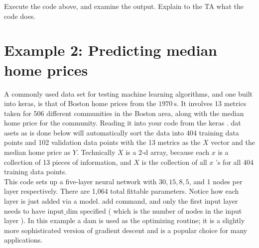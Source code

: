 \begin{problem}\label{P13.2}Execute the code above, and examine the output. Explain to the TA what
the code does.\end{problem}



\section*{Example 2: Predicting median home prices}
A commonly used data set for testing machine learning algorithms, and one built into keras, is that of Boston home prices from the $1970 \mathrm{~s}$. It involves 13 metrics taken for 506 different communities in the Boston area, along with the median home price for the community. Reading it into your code from the keras . dat asets as is done below will automatically sort the data into 404 training data points and 102 validation data points with the 13 metrics as the $X$ vector and the median home price as $Y$. Technically $X$ is a 2-d array, because each $x$ is a collection of 13 pieces of information, and $X$ is the collection of all $x$ 's for all 404 training data points.\\
This code sets up a five-layer neural network with $30,15,8,5$, and 1 nodes per layer respectively. There are 1,064 total fittable parameters. Notice how each layer is just added via a model. add command, and only the first input layer needs to have input$\_$dim specified ( which is the number of nodes in the input layer ). In this example a dam is used as the optimizing routine; it is a slightly more sophisticated version of gradient descent and is a popular choice for many
applications.


